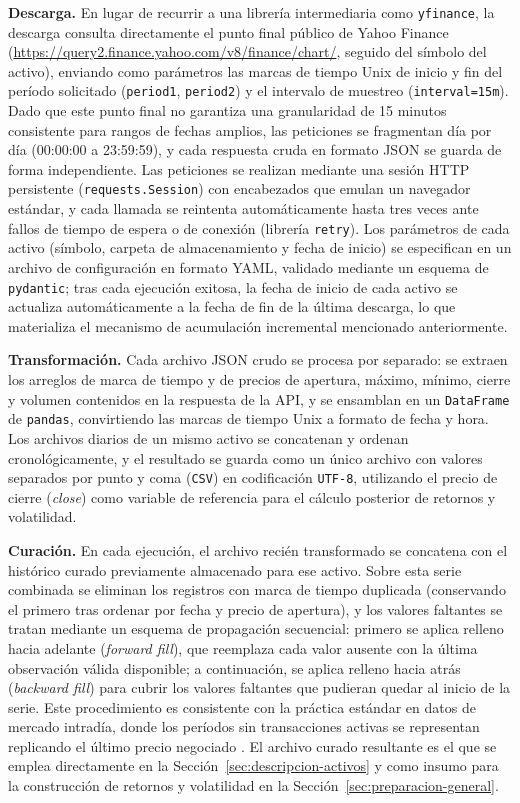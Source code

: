\documentclass[12pt]{paper}
\begin{document}
\textbf{Descarga.} En lugar de recurrir a una librería intermediaria como \texttt{yfinance}, la descarga consulta directamente el punto final público de Yahoo Finance (\url{https://query2.finance.yahoo.com/v8/finance/chart/}, seguido del símbolo del activo), enviando como parámetros las marcas de tiempo Unix de inicio y fin del período solicitado (\texttt{period1}, \texttt{period2}) y el intervalo de muestreo (\texttt{interval=15m}). Dado que este punto final no garantiza una granularidad de 15 minutos consistente para rangos de fechas amplios, las peticiones se fragmentan día por día (00:00:00 a 23:59:59), y cada respuesta cruda en formato JSON se guarda de forma independiente. Las peticiones se realizan mediante una sesión HTTP persistente (\texttt{requests.Session}) con encabezados que emulan un navegador estándar, y cada llamada se reintenta automáticamente hasta tres veces ante fallos de tiempo de espera o de conexión (librería \texttt{retry}). Los parámetros de cada activo (símbolo, carpeta de almacenamiento y fecha de inicio) se especifican en un archivo de configuración en formato YAML, validado mediante un esquema de \texttt{pydantic}; tras cada ejecución exitosa, la fecha de inicio de cada activo se actualiza automáticamente a la fecha de fin de la última descarga, lo que materializa el mecanismo de acumulación incremental mencionado anteriormente.

\textbf{Transformación.} Cada archivo JSON crudo se procesa por separado: se extraen los arreglos de marca de tiempo y de precios de apertura, máximo, mínimo, cierre y volumen contenidos en la respuesta de la API, y se ensamblan en un \texttt{DataFrame} de \texttt{pandas}, convirtiendo las marcas de tiempo Unix a formato de fecha y hora. Los archivos diarios de un mismo activo se concatenan y ordenan cronológicamente, y el resultado se guarda como un único archivo con valores separados por punto y coma (\texttt{CSV}) en codificación \texttt{UTF-8}, utilizando el precio de cierre (\textit{close}) como variable de referencia para el cálculo posterior de retornos y volatilidad.

\textbf{Curación.} En cada ejecución, el archivo recién transformado se concatena con el histórico curado previamente almacenado para ese activo. Sobre esta serie combinada se eliminan los registros con marca de tiempo duplicada (conservando el primero tras ordenar por fecha y precio de apertura), y los valores faltantes se tratan mediante un esquema de propagación secuencial: primero se aplica relleno hacia adelante (\textit{forward fill}), que reemplaza cada valor ausente con la última observación válida disponible; a continuación, se aplica relleno hacia atrás (\textit{backward fill}) para cubrir los valores faltantes que pudieran quedar al inicio de la serie. Este procedimiento es consistente con la práctica estándar en datos de mercado intradía, donde los períodos sin transacciones activas se representan replicando el último precio negociado \cite{jansen2020machine}. El archivo curado resultante es el que se emplea directamente en la Sección~\ref{sec:descripcion-activos} y como insumo para la construcción de retornos y volatilidad en la Sección~\ref{sec:preparacion-general}.
\end{document}
